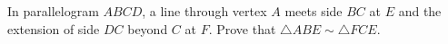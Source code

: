 In parallelogram $ABCD$, a line through vertex $A$ meets side $BC$ at $E$ and the extension of side $DC$ beyond $C$ at $F$. Prove that $\triangle ABE\sim\triangle FCE$.
